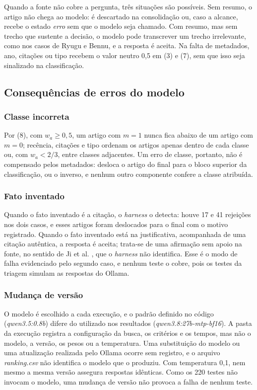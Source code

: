 \documentclass[10pt,a4paper,twocolumn]{article}
\newcommand{\cod}[1]{\textit{#1}}
\begin{document}
Quando a fonte não cobre a pergunta, três situações são possíveis. Sem resumo, o artigo não chega ao modelo: é descartado na consolidação ou, caso a alcance, recebe o estado \cod{erro} sem que o modelo seja chamado. Com resumo, mas sem trecho que sustente a decisão, o modelo pode transcrever um trecho irrelevante, como nos casos de Ryugu e Bennu, e a resposta é aceita. Na falta de metadados, ano, citações ou tipo recebem o valor neutro 0,5 em (3) e (7), sem que isso seja sinalizado na classificação.

\subsection{Consequências de erros do modelo}

\subsubsection{Classe incorreta} Por (8), com $w_a \ge 0{,}5$, um artigo com $m = 1$ nunca fica abaixo de um artigo com $m = 0$; recência, citações e tipo ordenam os artigos apenas dentro de cada classe ou, com $w_a < 2/3$, entre classes adjacentes. Um erro de classe, portanto, não é compensado pelos metadados: desloca o artigo do final para o bloco superior da classificação, ou o inverso, e nenhum outro componente confere a classe atribuída.

\subsubsection{Fato inventado} Quando o fato inventado é a citação, o \emph{harness} o detecta: houve 17 e 41 rejeições nos dois casos, e esses artigos foram deslocados para o final com o motivo registrado. Quando o fato inventado está na justificativa, acompanhada de uma citação autêntica, a resposta é aceita; trata-se de uma afirmação sem apoio na fonte, no sentido de Ji et al. \cite{ji}, que o \emph{harness} não identifica. Esse é o modo de falha evidenciado pelo segundo caso, e nenhum teste o cobre, pois os testes da triagem simulam as respostas do Ollama.

\subsubsection{Mudança de versão} O modelo é escolhido a cada execução, e o padrão definido no código (\cod{qwen3.5:0.8b}) difere do utilizado nos resultados (\cod{qwen3.8:27b-mtp-bf16}). A pasta da execução registra a configuração da busca, os critérios e os tempos, mas não o modelo, a versão, os pesos ou a temperatura. Uma substituição do modelo ou uma atualização realizada pelo Ollama ocorre sem registro, e o arquivo \cod{ranking.csv} não identifica o modelo que o produziu. Com temperatura 0,1, nem mesmo a mesma versão assegura respostas idênticas. Como os 220 testes não invocam o modelo, uma mudança de versão não provoca a falha de nenhum teste.
\end{document}
